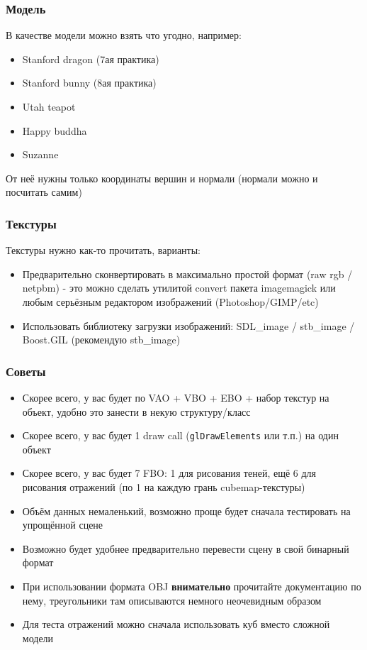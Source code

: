 \documentclass{beamer}
\begin{document}
\begin{frame}[fragile]
\frametitle{Модель}
В качестве модели можно взять что угодно, например:
\begin{itemize}
\item Stanford dragon (7ая практика)
\item Stanford bunny (8ая практика)
\item Utah teapot
\item Happy buddha
\item Suzanne
\end{itemize}
От неё нужны только координаты вершин и нормали (нормали можно и посчитать самим)
\end{frame}

\begin{frame}[fragile]
\frametitle{Текстуры}
Текстуры нужно как-то прочитать, варианты:
\begin{itemize}
\item Предварительно сконвертировать в максимально простой формат (raw rgb / netpbm) - это можно сделать утилитой convert пакета imagemagick или любым серьёзным редактором изображений (Photoshop/GIMP/etc)
\item Использовать библиотеку загрузки изображений: SDL\_image / stb\_image / Boost.GIL (рекомендую stb\_image)
\end{itemize}
\end{frame}

\begin{frame}[fragile]
\frametitle{Советы}
\begin{itemize}
\item Скорее всего, у вас будет по VAO + VBO + EBO + набор текстур на объект, удобно это занести в некую структуру/класс
\item Скорее всего, у вас будет 1 draw call (\verb|glDrawElements| или т.п.) на один объект
\item Скорее всего, у вас будет 7 FBO: 1 для рисования теней, ещё 6 для рисования отражений (по 1 на каждую грань cubemap-текстуры)
\item Объём данных немаленький, возможно проще будет сначала тестировать на упрощённой сцене
\item Возможно будет удобнее предварительно перевести сцену в свой бинарный формат
\item При использовании формата OBJ \textbf{внимательно} прочитайте документацию по нему, треугольники там описываются немного неочевидным образом
\item Для теста отражений можно сначала использовать куб вместо сложной модели
\end{itemize}
\end{frame}
\end{document}
